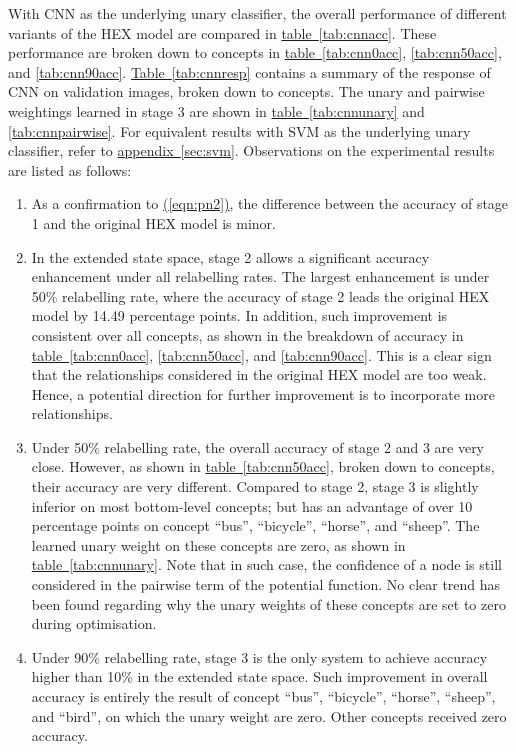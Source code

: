 \documentclass[11pt,a4paper]{book}
\begin{document}
With CNN as the underlying unary classifier, the overall performance of different variants of the HEX model are compared in \hyperref[tab:cnnacc]{table~\ref{tab:cnnacc}}. These performance are broken down to concepts in \hyperref[tab:cnn0acc]{table~\ref{tab:cnn0acc}}, \ref{tab:cnn50acc}, and \ref{tab:cnn90acc}. \hyperref[tab:cnnresp]{Table~\ref{tab:cnnresp}} contains a summary of the response of CNN on validation images, broken down to concepts. The unary and pairwise weightings learned in stage 3 are shown in \hyperref[tab:cnnunary]{table~\ref{tab:cnnunary}} and \ref{tab:cnnpairwise}. For equivalent results with SVM as the underlying unary classifier, refer to \hyperref[sec:svm]{appendix~\ref{sec:svm}}. Observations on the experimental results are listed as follows:
\begin{enumerate}
\item As a confirmation to \hyperref[eqn:pn2]{(\ref{eqn:pn2})}, the difference between the accuracy of stage 1 and the original HEX model is minor.
\item In the extended state space, stage 2 allows a significant accuracy enhancement under all relabelling rates. The largest enhancement is under 50\% relabelling rate, where the accuracy of stage 2 leads the original HEX model by 14.49 percentage points. In addition, such improvement is consistent over all concepts, as shown in the breakdown of accuracy in \hyperref[tab:cnn0acc]{table~\ref{tab:cnn0acc}}, \ref{tab:cnn50acc}, and \ref{tab:cnn90acc}. This is a clear sign that the relationships considered in the original HEX model are too weak. Hence, a potential direction for further improvement is to incorporate more relationships.
\item Under 50\% relabelling rate, the overall accuracy of stage 2 and 3 are very close. However, as shown in \hyperref[tab:cnn0acc]{table~\ref{tab:cnn50acc}}, broken down to concepts, their accuracy are very different. Compared to stage 2, stage 3 is slightly inferior on most bottom-level concepts; but has an advantage of over 10 percentage points on concept ``bus'', ``bicycle'', ``horse'', and ``sheep''. The learned unary weight on these concepts are zero, as shown in \hyperref[tab:cnnunary]{table~\ref{tab:cnnunary}}. Note that in such case, the confidence of a node is still considered in the pairwise term of the potential function. No clear trend has been found regarding why the unary weights of these concepts are set to zero during optimisation.
\item Under 90\% relabelling rate, stage 3 is the only system to achieve accuracy higher than 10\% in the extended state space. Such improvement in overall accuracy is entirely the result of concept ``bus'', ``bicycle'', ``horse'', ``sheep'', and ``bird'', on which the unary weight are zero. Other concepts received zero accuracy.
\end{enumerate}
\end{document}

